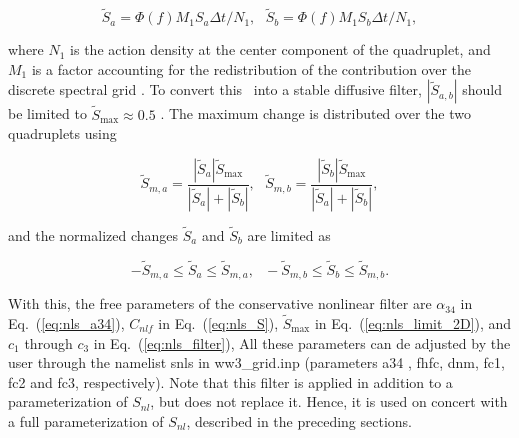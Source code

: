 \begin{equation}
\tilde{S}_a = \Phi(f) M_1 S_a \Delta t / N_1
, \:\:\:
\tilde{S}_b = \Phi(f) M_1 S_b \Delta t / N_1
, \label{eq:nls_tilde_s}
\end{equation}

\noindent 
where $N_1$ is the action density at the center component of the quadruplet,
and $M_1$ is a factor accounting for the redistribution of the contribution
over the discrete spectral grid \citep[for details, see][]{tol:OMOD11}. To
convert this \dia\ into a stable diffusive filter, $|\tilde{S}_{a,b}|$ should
be limited to $\tilde{S}_{\max} \approx 0.5$ \citep[e.g.,][]{bk:Fle88}. The
maximum change is distributed over the two quadruplets using

\begin{equation}
\tilde{S}_{m,a} = 
   \frac{|\tilde{S}_a|\tilde{S}_{\max}}{|\tilde{S}_a|+|\tilde{S}_b|}
 , \:\:\:
\tilde{S}_{m,b} = 
   \frac{|\tilde{S}_b|\tilde{S}_{\max}}{|\tilde{S}_a|+|\tilde{S}_b|}
 ,
\label{eq:nls_limit_2D}
\end{equation}

\noindent
and the normalized changes $\tilde{S}_a$ and $\tilde{S}_b$ are limited as

\begin{equation}
- \tilde{S}_{m,a} \leq \tilde{S}_a \leq \tilde{S}_{m,a}, \:\:\:
- \tilde{S}_{m,b} \leq \tilde{S}_b \leq \tilde{S}_{m,b}.
\label{eq:nls_limit}
\end{equation}

\noindent 
With this, the free parameters of the conservative nonlinear filter are
$\alpha_{34}$ in Eq.~(\ref{eq:nls_a34}), $C_{nlf}$ in Eq.~(\ref{eq:nls_S}),
$\tilde{S}_{\max}$ in Eq.~(\ref{eq:nls_limit_2D}), and $c_1$ through $c_3$ in
Eq.~(\ref{eq:nls_filter}), All these parameters can de adjusted by the user
through the namelist {\F snls} in {\file ww3\_grid.inp} (parameters {\F a34} ,
{\F fhfc}, {\F dnm}, {\F fc1}, {\F fc2} and {\F fc3}, respectively).  Note
that this filter is applied in addition to a parameterization of $S_{nl}$, but
does not replace it. Hence, it is used on concert with a full parameterization
of $S_{nl}$, described in the preceding sections.
